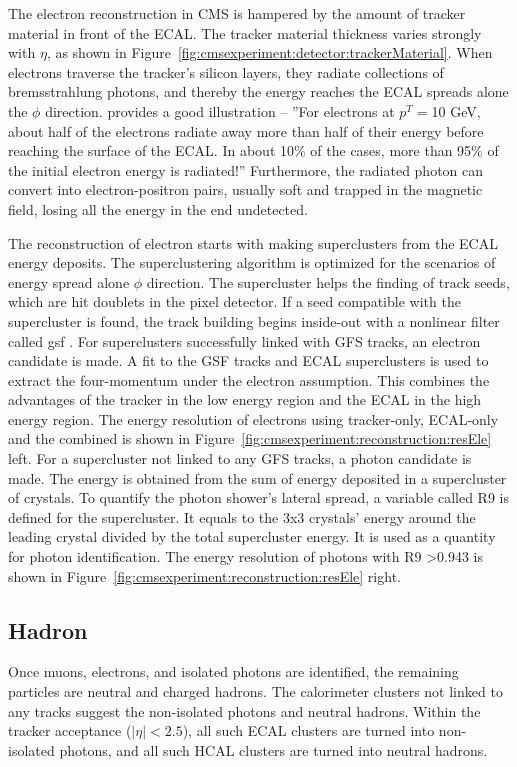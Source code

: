 The electron reconstruction in CMS is hampered by the amount of tracker material in front of the ECAL. The tracker material thickness varies strongly with $\eta$, as shown in Figure~\ref{fig:cmsexperiment:detector:trackerMaterial}. When electrons traverse the tracker's silicon layers, they radiate collections of bremsstrahlung photons, and thereby the energy reaches the ECAL spreads alone the $\phi$ direction. \cite{cms:tdr1:Bayatian:2006nff} provides a good illustration -- ''For electrons at $p^T=$10 GeV, about half of the electrons radiate away more than half of their energy before reaching the surface of the ECAL. In about 10$\%$ of the cases, more than 95$\%$ of the initial electron energy is radiated!'' Furthermore, the radiated photon can convert into electron-positron pairs, usually soft and trapped in the magnetic field, losing all the energy in the end undetected.

The reconstruction of electron starts with making superclusters from the ECAL energy deposits. The superclustering algorithm is optimized for the scenarios of energy spread alone $\phi$ direction. The supercluster helps the finding of track seeds, which are hit doublets in the pixel detector. If a seed compatible with the supercluster is found, the track building begins inside-out with a nonlinear filter called \acrfull{gsf} \cite{tech:gsf:Adam:2005bya}. For superclusters successfully linked with GFS tracks, an electron candidate is made. A fit to the GSF tracks and ECAL superclusters is used to extract the four-momentum under the electron assumption. This combines the advantages of the tracker in the low energy region and the ECAL in the high energy region. The energy resolution of electrons using tracker-only, ECAL-only and the combined is shown in Figure~\ref{fig:cmsexperiment:reconstruction:resEle} left. For a supercluster not linked to any GFS tracks, a photon candidate is made. The energy is obtained from the sum of energy deposited in a supercluster of crystals. To quantify the photon shower's lateral spread, a variable called R9 is defined for the supercluster. It equals to the 3x3 crystals' energy around the leading crystal divided by the total supercluster energy. It is used as a quantity for photon identification. The energy resolution of photons with R9 >0.943 is shown in Figure~\ref{fig:cmsexperiment:reconstruction:resEle} right.



\subsection{Hadron}
Once muons, electrons, and isolated photons are identified, the remaining particles are neutral and charged hadrons. The calorimeter clusters not linked to any tracks suggest the non-isolated photons and neutral hadrons. Within the tracker acceptance ($|\eta|< 2.5$), all such ECAL clusters are turned into non-isolated photons, and all such HCAL clusters are turned into neutral hadrons. 


